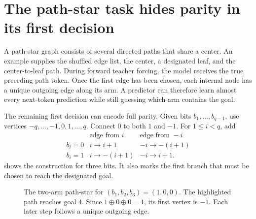 \documentclass[11pt,twoside]{article}
\theoremstyle{definition}
\theoremstyle{remark}
\begin{document}
\section{The path-star task hides parity in its first decision}
\label{sec:path-star}

A path-star graph consists of several directed paths that share a center. An
example supplies the shuffled edge list, the center, a designated leaf, and
the center-to-leaf path. During forward teacher forcing, the model receives
the true preceding path token. Once the first edge has been chosen, each
internal node has a unique outgoing edge along its arm. A predictor can
therefore learn almost every next-token prediction while still guessing which
arm contains the goal.

The remaining first decision can encode full parity. Given bits
$b_1,\ldots,b_{q-1}$, use vertices
$-q,\ldots,-1,0,1,\ldots,q$. Connect $0$ to both $1$ and $-1$. For
$1\le i<q$, add
\[
\begin{array}{c|cc}
&\text{edge from }i&\text{edge from }-i\\
\hline
b_i=0&i\to i+1&-i\to-(i+1)\\
b_i=1&i\to-(i+1)&-i\to i+1.
\end{array}
\]
 shows the construction for three bits. It also marks
the first branch that must be chosen to reach the designated goal.

\begin{figure}[htbp]
\centering
{}
\caption{The two-arm path-star for $(b_1,b_2,b_3)=(1,0,0)$.
The highlighted path reaches goal $4$. Since $1\oplus0\oplus0=1$, its
first vertex is $-1$. Each later step follows a unique outgoing edge.}
\label{fig:path-star}
\end{figure}
\end{document}
